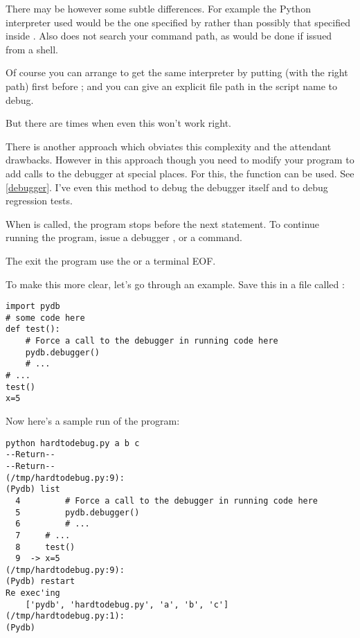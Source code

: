 There may be however some subtle differences. For example the Python
interpreter used would be the one specified by  rather than
possibly that specified inside . Also 
does not search your command path, as would be done if issued from a
shell.

Of course you can arrange to get the same interpreter by putting
 (with the right path) first before ; and you
can give an explicit file path in the script name to debug.

But there are times when even this won't work right.

There is another approach which obviates this complexity and the
attendant drawbacks. However in this approach though you need to
modify your program to add calls to the debugger at special
places. For this, the  function  can be
used. See \ref{debugger}. I've even this method to debug the debugger
itself and to debug regression tests.

When  is called, the program stops before the
next statement. To continue running the program, issue a debugger
,  or a  command.

The exit the program use the  or a terminal EOF.

To make this more clear, let's go through an example. Save this in a
file called :

\begin{verbatim}
import pydb
# some code here
def test():
    # Force a call to the debugger in running code here
    pydb.debugger()
    # ...
# ...
test()
x=5
\end{verbatim}

Now here's a sample run of the program:

\begin{verbatim}
python hardtodebug.py a b c
--Return--
--Return--
(/tmp/hardtodebug.py:9):
(Pydb) list
  4         # Force a call to the debugger in running code here
  5         pydb.debugger()
  6         # ...
  7     # ...
  8     test()
  9  -> x=5
(/tmp/hardtodebug.py:9): 
(Pydb) restart
Re exec'ing
	['pydb', 'hardtodebug.py', 'a', 'b', 'c']
(/tmp/hardtodebug.py:1): 
(Pydb) 
\end{verbatim}

